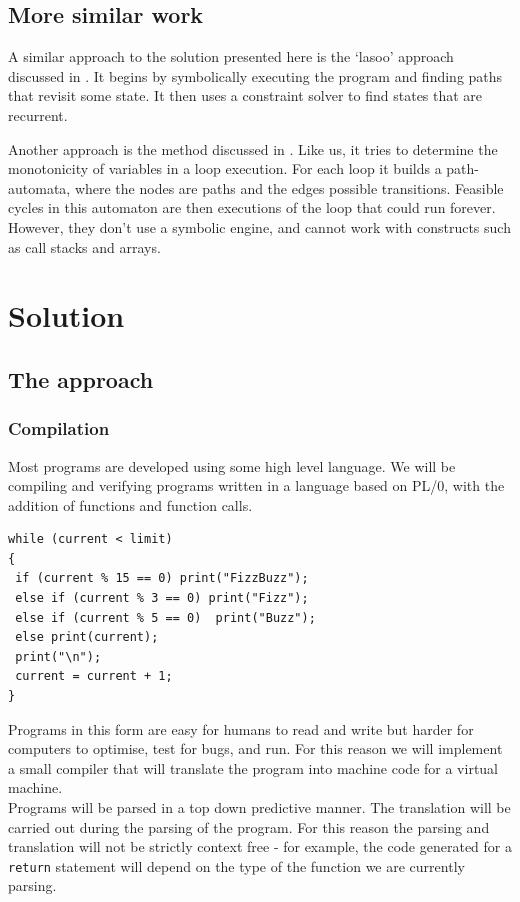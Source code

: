 \documentclass[12pt,a4paper]{article}
\begin{document}
\subsection{More similar work}
A similar approach to the solution presented here is the `lasoo' approach discussed in \citep{gupta}. It begins by symbolically executing the program and finding paths that revisit some state. It then uses a constraint solver to find states that are recurrent.

Another approach is the method discussed in \citep{loopster}. Like us, it tries to determine the monotonicity of variables in a loop execution. For each loop it builds a path-automata, where the nodes are paths and the edges possible transitions. Feasible cycles in this automaton are then executions of the loop that could run forever.
However, they don't use a symbolic engine, and cannot work with constructs such as call stacks and arrays.


\section{Solution}
\subsection{The approach}
\subsubsection{Compilation}
Most programs are developed using some high level language. We will be compiling and verifying programs written in a language based on PL/0, with the addition
of functions and function calls.

\begin{lstlisting}[frame=tlrb,language=myLang, caption=Fizzbuzz., label={fizzbuzz}, numbers=none]
while (current < limit)
{
 if (current % 15 == 0) print("FizzBuzz");
 else if (current % 3 == 0) print("Fizz");
 else if (current % 5 == 0)  print("Buzz");
 else print(current);
 print("\n");
 current = current + 1;
}
\end{lstlisting}

Programs in this form are easy for humans to read and write but harder for computers to optimise, test for bugs, and run. For this reason we will implement a small compiler that will translate the program into machine
code for a virtual machine.\\
Programs will be parsed in a top down predictive manner. The translation will be carried out during the parsing of the program. For this reason the parsing and translation will not be strictly context free - for example, the code generated
for a \texttt{return} statement will depend on the type of the function we are currently parsing.\\\par
\end{document}
